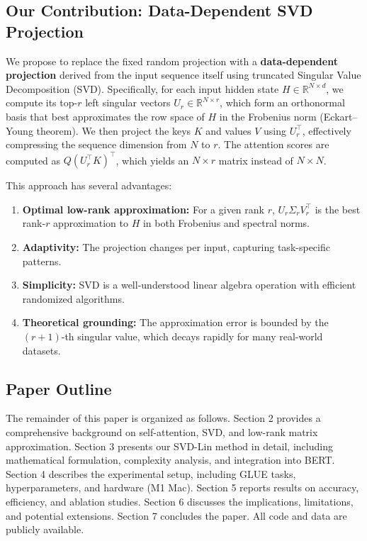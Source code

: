 \subsection{Our Contribution: Data-Dependent SVD Projection}
We propose to replace the fixed random projection with a \textbf{data-dependent projection} derived from the input sequence itself using truncated Singular Value Decomposition (SVD). Specifically, for each input hidden state $H \in \mathbb{R}^{N \times d}$, we compute its top-$r$ left singular vectors $U_r \in \mathbb{R}^{N \times r}$, which form an orthonormal basis that best approximates the row space of $H$ in the Frobenius norm (Eckart–Young theorem). We then project the keys $K$ and values $V$ using $U_r^\top$, effectively compressing the sequence dimension from $N$ to $r$. The attention scores are computed as $Q (U_r^\top K)^\top$, which yields an $N \times r$ matrix instead of $N \times N$.

This approach has several advantages:
\begin{enumerate}
    \item \textbf{Optimal low-rank approximation:} For a given rank $r$, $U_r \Sigma_r V_r^\top$ is the best rank-$r$ approximation to $H$ in both Frobenius and spectral norms.
    \item \textbf{Adaptivity:} The projection changes per input, capturing task-specific patterns.
    \item \textbf{Simplicity:} SVD is a well-understood linear algebra operation with efficient randomized algorithms.
    \item \textbf{Theoretical grounding:} The approximation error is bounded by the $(r+1)$-th singular value, which decays rapidly for many real-world datasets.
\end{enumerate}

\subsection{Paper Outline}
The remainder of this paper is organized as follows. Section 2 provides a comprehensive background on self-attention, SVD, and low-rank matrix approximation. Section 3 presents our SVD-Lin method in detail, including mathematical formulation, complexity analysis, and integration into BERT. Section 4 describes the experimental setup, including GLUE tasks, hyperparameters, and hardware (M1 Mac). Section 5 reports results on accuracy, efficiency, and ablation studies. Section 6 discusses the implications, limitations, and potential extensions. Section 7 concludes the paper. All code and data are publicly available.